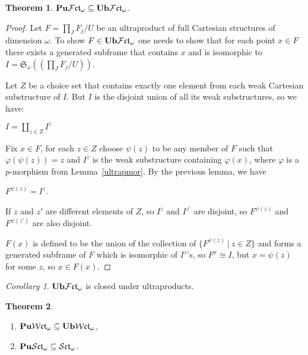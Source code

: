 \documentclass{article}
\theoremstyle{defin}
\theoremstyle{theorem}
\newtheorem{theorem}{Theorem}
\theoremstyle{claim}
\theoremstyle{prop}
\theoremstyle{lemma}
\theoremstyle{fact}
\theoremstyle{remark}
\theoremstyle{ex}
\theoremstyle{col}
\newtheorem{col}{Corollary}
\theoremstyle{question}
\begin{document}
\begin{theorem} \label{puub}
${\bf Pu}\mathcal{F}\mathfrak{ct}_{\omega} \subseteq {\bf Ub}\mathcal{F}\mathfrak{ct}_{\omega}$.
\end{theorem}

\begin{proof}
Let $F = \prod \limits_J F_j / U$ be an ultraproduct of full Cartesian structures of dimension $\omega$. 
To show $F \in {\bf Ub}\mathcal{F}\mathfrak{ct}_{\omega}$ one needs to show that for each point $x \in F$ 
there exists a generated subframe that contains $x$ and is isomorphic to 
$I = \mathfrak{S}_{\omega}((\prod \limits_J F_j / U))$.

Let $Z$ be a choice set that contains exactly one element from each weak Cartesian substructure of $I$. 
But $I$ is the disjoint union of all its weak substructures, so we have:
\begin{center}
$I = \coprod \limits_{z \in Z} I^z$
\end{center}
Fix $x \in F$, for each $z \in Z$ choose $\psi(z)$ to be any member of $F$ such that 
$\varphi(\psi(z)) = z$ and $I^z$ is the weak substructure containing $\varphi(x)$, 
where $\varphi$ is a $p$-morphism from Lemma~\ref{ultrapmor}. By the previous lemma, we have
\begin{center}
$F^{\psi(z)} = I^z$.
\end{center}

If $z$ and $z'$ are different elements of $Z$, so $I^z$ and $I^{z'}$ are disjoint, 
so $F^{\psi(z)}$ and $F^{\psi(z')}$ are also disjoint. 

$F(x)$ is defined to be the union of the collection of $\{ F^{\psi(z)} \: | \: z \in Z \}$ and 
forms a generated subframe of $F$ which is isomorphic of $I^z$'s, so $F^x \cong I$,
but $x = \psi(z)$ for some $z$, so $x \in F(x)$. 
\end{proof}

\begin{col}
${\bf Ub}\mathcal{F}\mathfrak{ct}_{\omega}$ is closed under ultraproducts.
\end{col}

\begin{theorem}
$ $

\begin{enumerate}
\item ${\bf Pu}\mathcal{W}\mathfrak{ct}_{\omega} \subseteq {\bf Ub}\mathcal{W}\mathfrak{ct}_{\omega}$,
\item ${\bf Pu}\mathcal{S}\mathfrak{ct}_{\omega} \subseteq \mathcal{S}\mathfrak{ct}_{\omega}$.
\end{enumerate}
\end{theorem}
\end{document}
